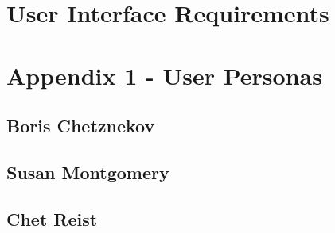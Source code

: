 \documentclass[a4paper,12pt]{article}
\begin{document}
\section*{User Interface Requirements}

\newpage 
\section*{Appendix 1 - User Personas}
\subsection*{Boris Chetznekov}
\subsection*{Susan Montgomery}
\subsection*{Chet Reist}
\end{document}
